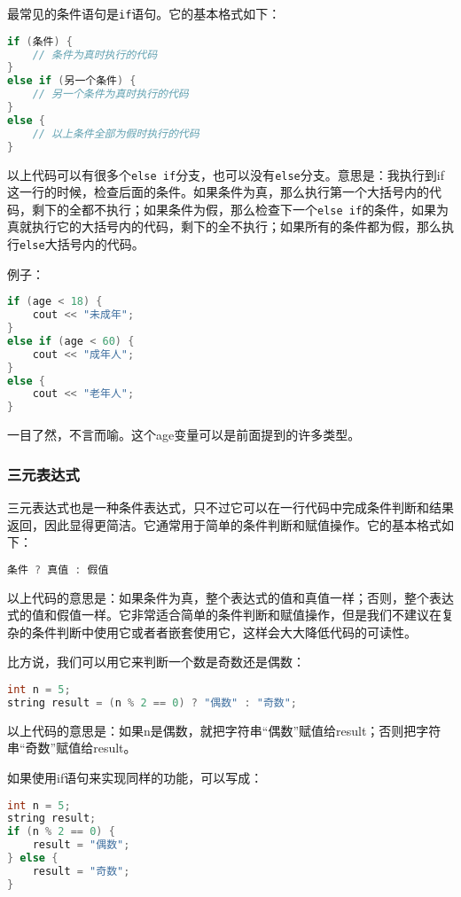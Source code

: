 最常见的条件语句是\texttt{if}语句。它的基本格式如下：
\begin{lstlisting}[language=C++]
if (条件) {
    // 条件为真时执行的代码
}
else if (另一个条件) {
    // 另一个条件为真时执行的代码
}
else {
    // 以上条件全部为假时执行的代码
}
\end{lstlisting}
以上代码可以有很多个\texttt{else if}分支，也可以没有\texttt{else}分支。意思是：我执行到if这一行的时候，检查后面的条件。如果条件为真，那么执行第一个大括号内的代码，剩下的全都不执行；如果条件为假，那么检查下一个\texttt{else if}的条件，如果为真就执行它的大括号内的代码，剩下的全不执行；如果所有的条件都为假，那么执行\texttt{else}大括号内的代码。

例子：
\begin{lstlisting}[language=C++]
if (age < 18) {
    cout << "未成年";
}
else if (age < 60) {
    cout << "成年人";
}
else {
    cout << "老年人";
}
\end{lstlisting}
一目了然，不言而喻。这个age变量可以是前面提到的许多类型。

\subsubsection{三元表达式}

三元表达式也是一种条件表达式，只不过它可以在一行代码中完成条件判断和结果返回，因此显得更简洁。它通常用于简单的条件判断和赋值操作。它的基本格式如下：
\begin{lstlisting}[language=C++]
条件 ? 真值 : 假值
\end{lstlisting}
以上代码的意思是：如果条件为真，整个表达式的值和真值一样；否则，整个表达式的值和假值一样。它非常适合简单的条件判断和赋值操作，但是我们不建议在复杂的条件判断中使用它或者者嵌套使用它，这样会大大降低代码的可读性。

比方说，我们可以用它来判断一个数是奇数还是偶数：
\begin{lstlisting}[language=C++]
int n = 5;
string result = (n % 2 == 0) ? "偶数" : "奇数";
\end{lstlisting}
以上代码的意思是：如果n是偶数，就把字符串“偶数”赋值给result；否则把字符串“奇数”赋值给result。

如果使用if语句来实现同样的功能，可以写成：
\begin{lstlisting}[language=C++]
int n = 5;
string result;
if (n % 2 == 0) {
    result = "偶数";
} else {
    result = "奇数";
}
\end{lstlisting}


